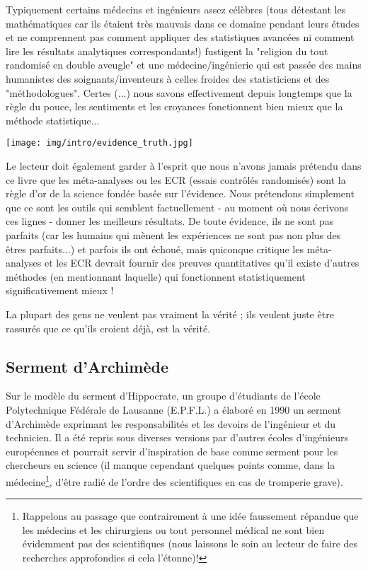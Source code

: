 	Typiquement certains médecins et ingénieurs assez célèbres (tous détestant les mathématiques car ils étaient très mauvais dans ce domaine pendant leurs études et ne comprennent pas comment appliquer des statistiques avancées ni comment lire les résultats analytiques correspondants!) fustigent la "religion du tout randomisé en double aveugle" et une médecine/ingénierie qui est passée des mains humanistes des soignants/inventeurs à celles froides des statisticiens et des "méthodologues". Certes (...) nous savons effectivement depuis longtemps que la règle du pouce, les sentiments et les croyances fonctionnent bien mieux que la méthode statistique...
	\begin{center}
		\texttt{[image: img/intro/evidence\_truth.jpg]}
	\end{center}
	Le lecteur doit également garder à l'esprit que nous n'avons jamais prétendu dans ce livre que les méta-analyses ou les ECR (essais contrôlés randomisés) sont la règle d'or de la science fondée basée sur l'évidence. Nous prétendons simplement que ce sont les outils qui semblent factuellement - au moment où nous écrivons ces lignes - donner les meilleurs résultats. De toute évidence, ils ne sont pas parfaits (car les humains qui mènent les expériences ne sont pas non plus des êtres parfaits...) et parfois ils ont échoué, mais quiconque critique les méta-analyses et les ECR devrait fournir des preuves quantitatives qu'il existe d'autres méthodes (en mentionnant laquelle) qui fonctionnent statistiquement significativement mieux !
	
	\begin{fquote}La plupart des gens ne veulent pas vraiment la vérité ; ils veulent juste être rassurés que ce qu'ils croient déjà, est la vérité.
 	\end{fquote}
	
	\pagebreak
	\subsection{Serment d'Archimède}
	Sur le modèle du serment d'Hippocrate, un groupe d'\'etudiants de l'\'ecole Polytechnique F\'ed\'erale de Lausanne (E.P.F.L.) a \'elabor\'e en 1990 un serment d'Archimède exprimant les responsabilit\'es et les devoirs de l'ing\'enieur et du technicien. Il a \'et\'e repris sous diverses versions par d'autres \'ecoles d'ing\'enieurs europ\'eennes et pourrait servir d'inspiration de base comme serment pour les chercheurs en science (il manque cependant quelques points comme, dans la m\'edecine\footnote{Rappelons au passage que contrairement à une idée faussement répandue que les médecins et les chirurgiens ou tout personnel médical ne sont bien évidemment pas des scientifiques (nous laissons le soin au lecteur de faire des recherches approfondies si cela l'étonne)!}, d'être radi\'e de l'ordre des scientifiques en cas de tromperie grave).


